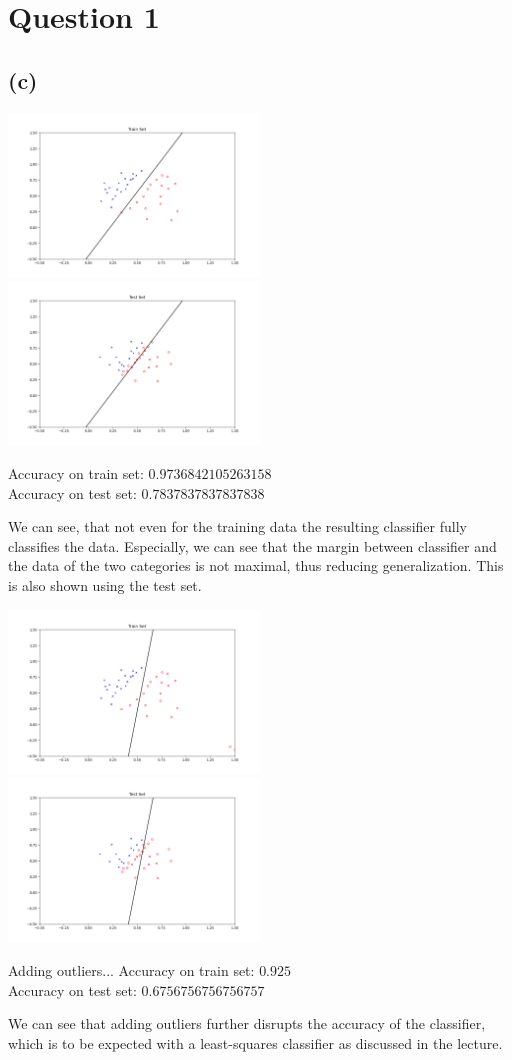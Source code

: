 \section*{Question 1}
\subsection*{(c)}
\includegraphics[width=0.5\textwidth]{q1_leastSquare_linear_classifier_python/Figure_1.png}
\includegraphics[width=0.5\textwidth]{q1_leastSquare_linear_classifier_python/Figure_2.png}

Accuracy on train set: $0.9736842105263158$ \\
Accuracy on test set: $0.7837837837837838$

We can see, that not even for the training data the resulting classifier fully classifies the data. Especially, we can see that the margin between classifier and the data of the two categories is not maximal, thus reducing generalization. This is also shown using the test set.


\includegraphics[width=0.5\textwidth]{q1_leastSquare_linear_classifier_python/Figure_3.png}
\includegraphics[width=0.5\textwidth]{q1_leastSquare_linear_classifier_python/Figure_4.png}


Adding outliers...
Accuracy on train set: $0.925$ \\
Accuracy on test set: $0.6756756756756757$

We can see that adding outliers further disrupts the accuracy of the classifier, which is to be expected with a least-squares classifier as discussed in the lecture.
